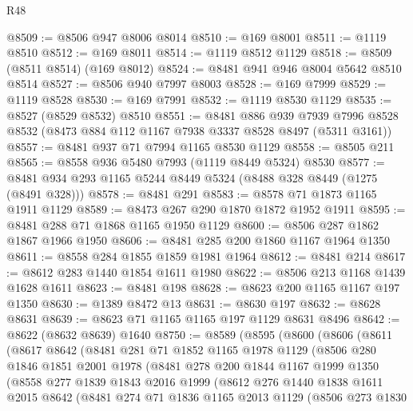 \begin{lexlean}{R48}
\begin{coremodule}
@8509 := @8506 @947 @8006 @8014
@8510 := @169 @8001
@8511 := @1119 @8510
@8512 := @169 @8011
@8514 := @1119 @8512 @1129
@8518 := @8509 (@8511 @8514) (@169 @8012)
@8524 := @8481 @941 @946 @8004 @5642 @8510 @8514
@8527 := @8506 @940 @7997 @8003
@8528 := @169 @7999
@8529 := @1119 @8528
@8530 := @169 @7991
@8532 := @1119 @8530 @1129
@8535 := @8527 (@8529 @8532) @8510
@8551 := @8481
    @886
    @939
    @7939
    @7996
    @8528
    @8532
    (@8473 @884 @112 @1167 @7938 @3337 @8528 @8497 (@5311 @3161))
@8557 := @8481 @937 @71 @7994 @1165 @8530 @1129
@8558 := @8505 @211
@8565 := @8558 @936 @5480 @7993 (@1119 @8449 @5324) @8530
@8577 := @8481 @934 @293 @1165 @5244 @8449 @5324 (@8488 @328 @8449 (@1275 (@8491 @328)))
@8578 := @8481 @291
@8583 := @8578 @71 @1873 @1165 @1911 @1129
@8589 := @8473 @267 @290 @1870 @1872 @1952 @1911
@8595 := @8481 @288 @71 @1868 @1165 @1950 @1129
@8600 := @8506 @287 @1862 @1867 @1966 @1950
@8606 := @8481 @285 @200 @1860 @1167 @1964 @1350
@8611 := @8558 @284 @1855 @1859 @1981 @1964
@8612 := @8481 @214
@8617 := @8612 @283 @1440 @1854 @1611 @1980
@8622 := @8506 @213 @1168 @1439 @1628 @1611
@8623 := @8481 @198
@8628 := @8623 @200 @1165 @1167 @197 @1350
@8630 := @1389 @8472 @13
@8631 := @8630 @197
@8632 := @8628 @8631
@8639 := @8623 @71 @1165 @1165 @197 @1129 @8631 @8496
@8642 := @8622 (@8632 @8639) @1640
@8750 := @8589
    (@8595
      (@8600
        (@8606
          (@8611
            (@8617
              @8642
              (@8481
                @281
                @71
                @1852
                @1165
                @1978
                @1129
                (@8506
                  @280
                  @1846
                  @1851
                  @2001
                  @1978
                  (@8481
                    @278
                    @200
                    @1844
                    @1167
                    @1999
                    @1350
                    (@8558
                      @277
                      @1839
                      @1843
                      @2016
                      @1999
                      (@8612
                        @276
                        @1440
                        @1838
                        @1611
                        @2015
                        @8642
                        (@8481
                          @274
                          @71
                          @1836
                          @1165
                          @2013
                          @1129
                          (@8506
                            @273
                            @1830

\end{coremodule}
\end{lexlean}
